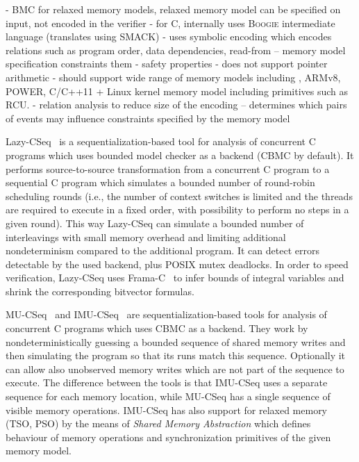 - BMC for relaxed memory models, relaxed memory model can be specified on input, not encoded in the verifier
- for C, internally uses \textsc{Boogie} intermediate language (translates using SMACK)
- uses symbolic encoding which encodes relations such as program order, data dependencies, read-from -- memory model specification constraints them
- safety properties
- does not support pointer arithmetic
- should support wide range of memory models including \xtso, ARMv8, POWER, C/C++11 + Linux kernel memory model including primitives such as RCU.
- relation analysis to reduce size of the encoding -- determines which pairs of events may influence constraints specified by the memory model

Lazy-CSeq~\cite{Inverso2015,Nguyen2017} is a sequentialization-based
tool for analysis of concurrent C programs which uses bounded model checker as
a backend (CBMC by default).
It performs source-to-source transformation from a concurrent C program to a
sequential C program which simulates a bounded number of round-robin scheduling
rounds (i.e., the number of context switches is limited and the threads are
required to execute in a fixed order, with possibility to perform no steps in a
given round).
This way Lazy-CSeq can simulate a bounded number of interleavings with small
memory overhead and limiting additional nondeterminism compared to the
additional program.
It can detect errors detectable by the used backend, plus POSIX mutex
deadlocks.
In order to speed verification, Lazy-CSeq uses Frama-C~\cite{Canet2009} to
infer  bounds of integral variables and shrink the corresponding bitvector
formulas.


MU-CSeq~\cite{Tomasco2015,Tomasco2016} and IMU-CSeq~\cite{Tomasco2017}
are sequentialization-based tools for analysis of concurrent C programs which
uses CBMC as a backend.
They work by nondeterministically guessing a bounded sequence of shared memory
writes and then simulating the program so that its runs match this sequence.
Optionally it can allow also unobserved memory writes which are not part of the
sequence to execute.
The difference between the tools is that IMU-CSeq uses a separate sequence for
each memory location, while MU-CSeq has a single sequence of visible memory
operations.
IMU-CSeq has also support for relaxed memory (TSO, PSO) by the means of
\emph{Shared Memory Abstraction} which defines behaviour of memory operations
and synchronization primitives of the given memory model.

